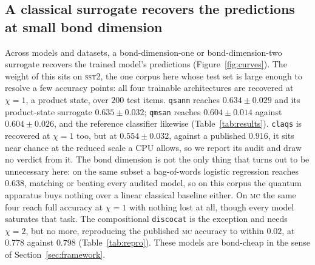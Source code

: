 \documentclass[10pt]{article}
\begin{document}
\subsection{A classical surrogate recovers the predictions at small bond dimension}
Across models and datasets, a bond-dimension-one or bond-dimension-two surrogate recovers the
trained model's predictions (Figure~\ref{fig:curves}). The weight of this sits on \textsc{sst2},
the one corpus here whose test set is large enough to resolve a few accuracy points: all four
trainable architectures are recovered at $\chi{=}1$, a product state, over $200$ test items.
\texttt{qsann} reaches $0.634\pm0.029$ and its product-state surrogate $0.635\pm0.032$;
\texttt{qmsan} reaches $0.604\pm0.014$ against $0.604\pm0.026$, and the reference classifier
likewise (Table~\ref{tab:results}). \texttt{claqs} is recovered at $\chi{=}1$ too, but at
$0.554\pm0.032$, against a published $0.916$, it sits near chance at the reduced scale a CPU
allows, so we report its audit and draw no verdict from it. The bond dimension is not the only
thing that turns out to be unnecessary here: on the same subset a bag-of-words logistic regression
reaches $0.638$, matching or beating every audited model, so on this corpus the quantum apparatus
buys nothing over a linear classical baseline either. On \textsc{mc} the same four reach full accuracy at $\chi{=}1$ with nothing
lost at all, though every model saturates that task. The compositional
\texttt{discocat} is the exception and needs $\chi{=}2$, but no more, reproducing the published
\textsc{mc} accuracy to within $0.02$, at $0.778$ against $0.798$ (Table~\ref{tab:repro}). These
models are bond-cheap in the sense of Section~\ref{sec:framework}.
\end{document}
